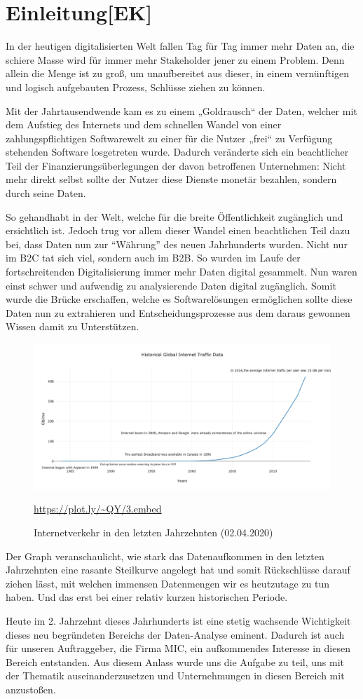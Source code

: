 \chapter{Einleitung[EK]}
In der heutigen digitalisierten Welt fallen Tag für Tag immer mehr Daten an, die schiere Masse wird für immer mehr Stakeholder jener zu einem Problem. Denn allein die Menge ist zu groß, um unaufbereitet aus dieser, in einem vernünftigen und logisch aufgebauten Prozess, Schlüsse ziehen zu können.
\par
Mit der Jahrtausendwende kam es zu einem „Goldrausch“ der Daten, welcher mit dem Aufstieg des Internets und dem schnellen Wandel von einer zahlungspflichtigen Softwarewelt zu einer für die Nutzer „frei“ zu Verfügung stehenden Software losgetreten wurde. Dadurch veränderte sich ein beachtlicher Teil der Finanzierungsüberlegungen der davon betroffenen Unternehmen: Nicht mehr direkt selbst sollte der Nutzer diese Dienste monetär bezahlen, sondern durch seine Daten.
\par
So gehandhabt in der Welt, welche für die breite Öffentlichkeit zugänglich und ersichtlich ist. Jedoch trug vor allem dieser Wandel einen beachtlichen Teil dazu bei, dass Daten nun zur “Währung” des neuen Jahrhunderts wurden. Nicht nur im B2C tat sich viel, sondern auch im B2B. So wurden im Laufe der fortschreitenden Digitalisierung immer mehr Daten digital gesammelt. Nun waren einst schwer und aufwendig zu analysierende Daten digital zugänglich. Somit wurde die Brücke erschaffen, welche es Softwarelösungen ermöglichen sollte diese Daten nun zu extrahieren und Entscheidungsprozesse aus dem daraus gewonnen Wissen damit zu Unterstützen.
\begin{figure}[H]
    \centering
    \includegraphics[scale=0.35]{images/Gfk-01.png}
    \caption{Internetverkehr in den letzten Jahrzehnten (02.04.2020)}
    \url{https://plot.ly/~QY/3.embed}
\end{figure}
Der Graph veranschaulicht, wie stark das Datenaufkommen in den letzten Jahrzehnten eine rasante Steilkurve angelegt hat und somit Rückschlüsse darauf ziehen lässt, mit welchen immensen Datenmengen wir es heutzutage zu tun haben. Und das erst bei einer relativ kurzen historischen Periode.
\par
Heute im 2. Jahrzehnt dieses Jahrhunderts ist eine stetig wachsende Wichtigkeit dieses neu begründeten Bereichs der Daten-Analyse eminent. Dadurch ist auch für unseren Auftraggeber, die Firma MIC, ein aufkommendes Interesse in diesen Bereich entstanden. Aus diesem Anlass wurde uns die Aufgabe zu teil, uns mit der Thematik auseinanderzusetzen und Unternehmungen in diesen Bereich mit anzustoßen.
\newpage
